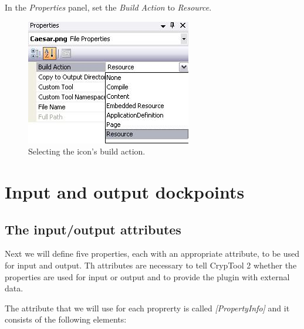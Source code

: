 In the \textit{Properties} panel, set the \textit{Build Action} to \textit{Resource}.

\begin{figure}[h!]
	\centering
		\includegraphics{figures/icon_build_action.jpg}
	\caption{Selecting the icon's build action.}
	\label{fig:icon_build_action}
\end{figure}
\clearpage

\section{Input and output dockpoints}

\subsection{The input/output attributes}
\label{sec:TheInputOutputAttributes}

Next we will define five properties, each with an appropriate attribute, to be used for input and output. Th attributes are necessary to tell CrypTool 2 whether the properties are used for input or output and to provide the plugin with external data.

The attribute that we will use for each proprerty is called \textit{[PropertyInfo]} and it consists of the following elements:

